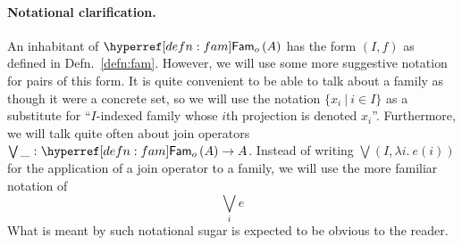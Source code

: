 \paragraph*{Notational clarification.} An inhabitant of $\sub{o}{A}$ has the form
$(I, f)$ as defined in Defn.~\ref{defn:fam}. However, we will use some more suggestive
notation for pairs of this form. It is quite convenient to be able to talk about a family
as though it were a concrete set, so we will use the notation $\{ x_i ~|~ i \in I \}$ as a
substitute for ``$I$-indexed family whose $i$th projection is denoted $x_i$''. Furthermore,
we will talk quite often about join operators $\oftyI{\bigvee\_}{\sub{o}{A} \rightarrow A}$. Instead of
writing $\bigvee (I, \lambda i.~e(i))$ for the application of a join operator to a family, we will
use the more familiar notation of
\begin{equation}\label{eqn:join-syntax}
  \bigvee_i e
\end{equation}
What is meant by such notational sugar is expected to be obvious to the reader.

